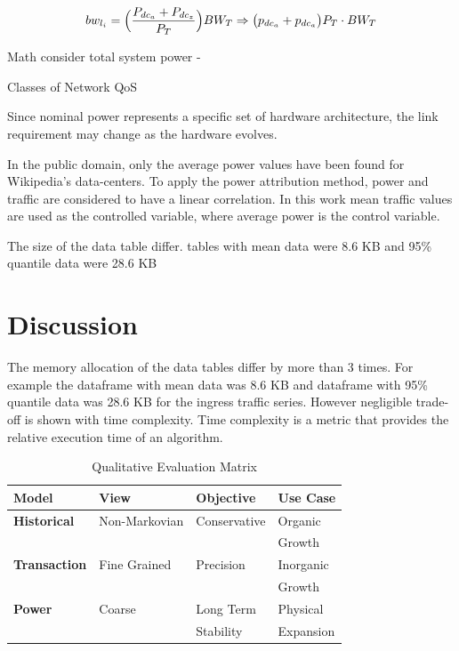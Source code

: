 \documentclass[conference]{IEEEtran}
\begin{document}
\begin{equation}
bw_{l_i}=\Big(\frac{P_{dc_a} + P_{dc_z}}{P_{T}}\Big){BW_{T}} \\
 \Rightarrow \big(p_{dc_a}+p_{dc_a}\big)P_T \cdot BW_T \label{eq:link_percentage}
\end{equation}


Math consider total system power - 

  
Classes of Network QoS

Since nominal power represents a specific set of hardware architecture, the link requirement may change as the hardware evolves.

In the public domain, only the average power values have been found for Wikipedia's data-centers. To apply the power attribution method, power and traffic are considered to have a linear correlation. In this work mean traffic values are used as the controlled variable, where average power is the control variable. 

The size of the data table differ. tables with mean data were 8.6 KB and 95\% quantile  data were 28.6 KB
 
 
 
\section{Discussion}

The memory allocation of the data tables differ by more than 3 times. For example the dataframe with mean data was 8.6 KB and dataframe with 95\% quantile data was 28.6 KB for the ingress traffic series. However negligible trade-off is shown with time complexity. Time complexity is a metric that provides the relative execution time of an algorithm.   


\begin{table}[htbp]
\caption{Qualitative Evaluation Matrix}
\begin{center}
\begin{tabular}{l|l|l|l}
\textbf{Model}        &  \textbf{View}   &\textbf{Objective}    & \textbf{Use Case}\\
	\hline\hline
\textbf{Historical}   &   Non-Markovian  & Conservative         & Organic          \\
                      &                  &                      & Growth           \\
\textbf{Transaction } &   Fine Grained   & Precision            & Inorganic        \\
                      &                  &                      & Growth           \\
\textbf{Power}        &   Coarse         & Long Term            & Physical         \\
                      &                  & Stability            & Expansion        \\
                      
\end{tabular}
\label{qualitative_comps}
\end{center}
\end{table}
\end{document}
